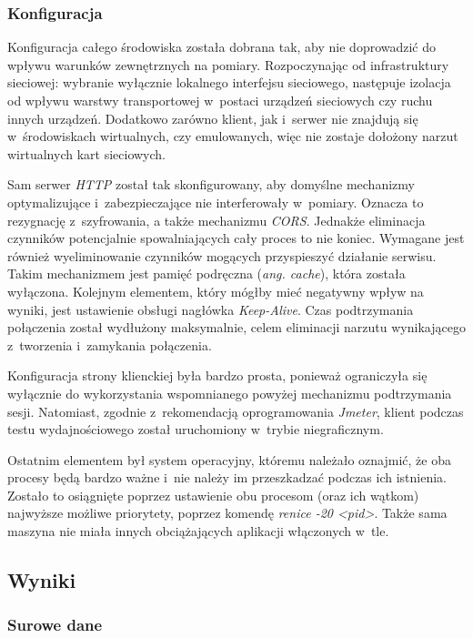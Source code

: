 \documentclass[12pt]{article}
\newcommand{\n}{\newline}
\newcommand{\nonpl}[1]{{\it #1}}
\newcommand{\code}[1]{{\it #1}}
\newcommand{\ang}[1]{\nonpl{ang. #1}}
\newcommand{\HTTP}{\nonpl{HTTP} }
\newcommand{\Jmeter}{\nonpl{Jmeter}\texttrademark}
\begin{document}
{{			{
				\subsubsection{Konfiguracja}

				Konfiguracja całego środowiska została dobrana tak, aby nie doprowadzić do wpływu warunków zewnętrznych na pomiary. Rozpoczynając od infrastruktury sieciowej:
				wybranie wyłącznie lokalnego interfejsu sieciowego, następuje izolacja od wpływu warstwy transportowej w~postaci urządzeń sieciowych czy ruchu innych urządzeń.
				Dodatkowo zarówno klient, jak i~serwer nie znajdują się w~środowiskach wirtualnych, czy emulowanych, więc nie zostaje dołożony narzut wirtualnych kart sieciowych.\n

				Sam serwer \HTTP został tak skonfigurowany, aby domyślne mechanizmy optymalizujące i~zabezpieczające nie interferowały w~pomiary. Oznacza to rezygnację z~szyfrowania,
				a także mechanizmu \nonpl{CORS}. Jednakże eliminacja czynników potencjalnie spowalniających cały proces to nie koniec. Wymagane jest również wyeliminowanie
				czynników mogących przyspieszyć działanie serwisu. Takim mechanizmem jest pamięć podręczna (\ang{cache}), która została wyłączona. Kolejnym elementem, który mógłby mieć negatywny
				wpływ na wyniki, jest ustawienie obsługi nagłówka \code{Keep-Alive}. Czas podtrzymania połączenia został wydłużony maksymalnie, celem eliminacji narzutu wynikającego
				z~tworzenia i~zamykania połączenia.\n

				Konfiguracja strony klienckiej była bardzo prosta, ponieważ ograniczyła się wyłącznie do wykorzystania wspomnianego powyżej mechanizmu podtrzymania sesji. Natomiast,
				zgodnie z~rekomendacją oprogramowania \Jmeter, klient podczas testu wydajnościowego został uruchomiony w~trybie niegraficznym.\n

				Ostatnim elementem był system operacyjny, któremu należało oznajmić, że oba procesy będą bardzo ważne i~nie należy im przeszkadzać podczas ich istnienia. Zostało to
				osiągnięte poprzez ustawienie obu procesom (oraz ich wątkom) najwyższe możliwe priorytety, poprzez komendę \code{renice -20 <pid>}.
				Także sama maszyna nie miała innych obciążających aplikacji włączonych w~tle.
			}
		}

		{
			\subsection{Wyniki}

			{
				\subsubsection{Surowe dane}

}}}
\end{document}
